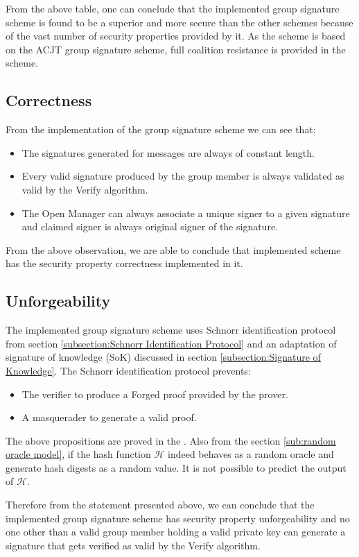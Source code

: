 From the above table, one can conclude that the implemented group signature scheme is found to be a superior and more secure than the other schemes because of the vast number of security properties provided by it. As the scheme is based on the ACJT group signature scheme, full coalition resistance is provided in the scheme.
\subsection{Correctness}
 From the implementation of the group signature scheme we can see that:
\begin{itemize}
\item The signatures generated for messages are always of constant length.
\item Every valid signature produced by the group member is always validated as valid by the Verify algorithm.
\item The Open Manager can always associate a unique signer to a given signature and claimed signer is always original signer of the signature. 
\end{itemize}
From the above observation, we are able to conclude that implemented scheme has the security property correctness implemented in it.

\subsection{Unforgeability}
The implemented group signature scheme uses Schnorr identification protocol from section \ref{subsection:Schnorr Identification Protocol} and an adaptation of signature of knowledge (SoK) discussed in section \ref{subsection:Signature of Knowledge}. The Schnorr identification protocol prevents:
\begin{itemize}
\item The verifier to produce a Forged proof provided by the prover.
\item A masquerader to generate a valid proof.
\end{itemize}
The above propositions are proved in the \cite{schnorr1991efficient}. Also from the section \ref{sub:random oracle model}, if the hash function $\mathcal{H}$ indeed behaves as a random oracle and generate hash digests as a random value. It is not possible to predict the output of $\mathcal{H}$. 

Therefore from the statement presented above, we can conclude that the implemented group signature scheme has security property unforgeability and no one other than a valid group member holding a valid private key can generate a signature that gets verified as valid by the Verify algorithm.

